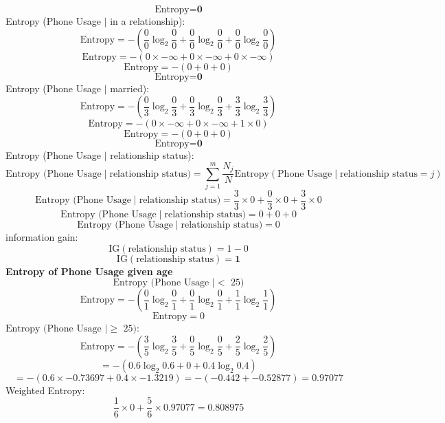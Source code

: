 \documentclass[a3paper,12pt]{extarticle} %
\begin{document}
\begin{enumerate}
        \[
        \text{Entropy} = \textbf{0}
        \]
        Entropy (Phone Usage $\mid$ in a relationship):
        \[
        \text{Entropy} = -\left(\frac{0}{0} \log_2 \frac{0}{0} + \frac{0}{0} \log_2 \frac{0}{0} + \frac{0}{0} \log_2 \frac{0}{0}\right)
        \]
        \[
        \text{Entropy} = -\left(0 \times -\infty + 0 \times -\infty + 0 \times -\infty\right)
        \]
        \[
        \text{Entropy} = -\left(0 + 0 + 0\right)
        \]
        \[
        \text{Entropy} = \textbf{0}
        \]
        Entropy (Phone Usage $\mid$ married):
        \[
        \text{Entropy} = -\left(\frac{0}{3} \log_2 \frac{0}{3} + \frac{0}{3} \log_2 \frac{0}{3} + \frac{3}{3} \log_2 \frac{3}{3}\right)
        \]
        \[
        \text{Entropy} = -\left(0 \times -\infty + 0 \times -\infty + 1 \times 0\right)
        \]
        \[
        \text{Entropy} = -\left(0 + 0 + 0\right)
        \]
        \[
        \text{Entropy} = \textbf{0}
        \]
        Entropy (Phone Usage $\mid$ relationship status):
        \[
        \text{Entropy (Phone Usage} \mid \text{relationship status)} = \sum_{j=1}^m \frac{N_j}{N} \text{Entropy}(\text{Phone Usage} \mid \text{relationship status} = j)
        \]
        \[
        \text{Entropy (Phone Usage} \mid \text{relationship status)} = \frac{3}{3} \times 0 + \frac{0}{3} \times 0 + \frac{3}{3} \times 0
        \]
        \[
        \text{Entropy (Phone Usage} \mid \text{relationship status)} = 0 + 0 + 0
        \]
        \[
        \text{Entropy (Phone Usage} \mid \text{relationship status)} = 0
        \]
        information gain:
        \[
        \text{IG}(\text{relationship status}) = 1 - 0
        \]
        \[
        \text{IG}(\text{relationship status}) = \textbf{1}
        \]
        \textbf{Entropy of Phone Usage given age}
        \[
            \text{Entropy (Phone Usage $\mid <$ 25)}  
        \]
        \[
            \text{Entropy} = -\left(\frac{0}{1} \log_2 \frac{0}{1} + \frac{0}{1} \log_2 \frac{0}{1} + \frac{1}{1} \log_2 \frac{1}{1}\right)
        \]
        \[
            \text{Entropy} = 0
        \]
        $\text{Entropy (Phone Usage  $\mid \geq$ 25)}:$
        \[
            \text{Entropy} = -\left(\frac{3}{5} \log_2 \frac{3}{5} + \frac{0}{5} \log_2 \frac{0}{5} + \frac{2}{5} \log_2 \frac{2}{5}\right)  
        \]
        \[
            = -\left(0.6 \log_2 0.6 + 0 + 0.4 \log_2 0.4\right)
        \]
        \[
            = -\left(0.6 \times - 0.73697 + 0.4 \times -1.3219 \right) 
            = -\left(-0.442 + -0.52877\right)
            = 0.97077
        \]
        Weighted Entropy:
        \[
        \frac{1}{6} \times 0 + \frac{5}{6} \times 0.97077 = 0.808975
\]
\end{enumerate}
\end{document}
